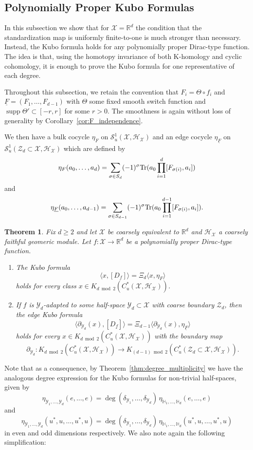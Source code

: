 \documentclass[12pt]{amsart}
\newtheorem{theorem}{Theorem}[section]
\newcommand{\RM}{{\mathbb R}}
\newcommand{\Ss}{{\mathcal S}}
\newcommand{\Hh}{{\mathcal H}}
\newcommand{\Xx}{{\mathcal X}}
\newcommand{\Yy}{{\mathcal Y}}
\newcommand{\Zz}{{\mathcal Z}}
\newcommand{\Tr}{\mbox{\rm Tr}}
\newcommand{\pdv}{\partial}
\DeclareMathOperator{\supp}{supp}
\begin{document}
\subsection{Polynomially Proper Kubo Formulas}

In this subsection we show that for $\Xx=\RM^d$ the condition that the standardization map is uniformly finite-to-one is much stronger than necessary. Instead, the Kubo formula holds for any polynomially proper Dirac-type function. The idea is that, using the homotopy invariance of both K-homology and cyclic cohomology, it is enough to prove the Kubo formula for one representative of each degree.

Throughout this subsection, we retain the convention that $F_i = \Theta \circ f_i$ and $\underline{F} = (F_1,\dots, F_{d-1})$ with $\Theta$ some fixed smooth switch function and $\supp \Theta' \subset [-r,r]$ for some $r >0$. The smoothness is again without loss of generality by Corollary~\ref{cor:F_independence}.

We then have a bulk cocycle $\eta_{F}$ on $\Ss_u^1(\Xx,\Hh_\Xx)$ and an edge cocycle $\eta_{\underline{F}}$ on $\Ss_u^1(\Zz_d\subset \Xx,\Hh_\Xx)$ which are defined by
$$\eta_{F}(a_0,\dots,a_d)= \sum_{\sigma\in S_{d}}(-1)^\sigma \Tr(a_{0}\prod_{i=1}^{d} [F_{\sigma(i)}, a_i])$$
and
$$\eta_{\underline{F}}(a_0,\dots,a_{d-1})= \sum_{\sigma\in S_{d-1}}(-1)^\sigma \Tr(a_{0}\prod_{i=1}^{d-1} [F_{\sigma(i)}, a_i]).$$

\begin{theorem}
\label{th:kubo_poly_proper}
Fix $d\geq 2$ and let $\Xx$ be coarsely equivalent to $\RM^d$ and $\Hh_\Xx$ a coarsely faithful geomeric module.
Let $f:\Xx\to \RM^d$ be a polynomially proper Dirac-type function.
\begin{enumerate}
    \item[(i)] The Kubo formula 
$$\langle x, [D_{f}]\rangle = \Xi_d \langle x, \eta_{F}\rangle$$ 
holds for every class $x\in K_{d\bmod 2}(C^*_u(\Xx, \Hh_\Xx))$.
    
    \item[(ii)] If $f$ is $\Yy_d$-adapted to some half-space $\Yy_d\subset \Xx$ with coarse boundary $\Zz_d$, then the edge Kubo formula
$$\langle \pdv_{\Yy_d}(x), [D_{\underline{f}}]\rangle=\Xi_{d-1} \langle  \pdv_{\Yy_d}(x) , \eta_{\underline{F}}\rangle$$
holds for every $x\in K_{d\bmod 2}(C^*_u(\Xx, \Hh_\Xx))$ with the boundary map \[\pdv_{\Yy_d}:  K_{d\bmod 2}(C^*_u(\Xx, \Hh_\Xx))\to  K_{(d-1) \bmod 2}(C^*_u(\Zz_d\subset \Xx, \Hh_\Xx)).\]
\end{enumerate}
\end{theorem}
Note that as a consequence, by Theorem~\ref{thm:degree_multiplicity} we have the analogous degree expression for the Kubo formulas for non-trivial half-spaces, given by 
\[\eta_{\Yy_1,\dots,\Yy_d}(e,\dots,e)=\deg(\delta_{\Yy_1},\dots,\delta_{\Yy_d} )\,\eta_{\mathbb{H}_1,\dots,\mathbb{H}_d}(e,\dots,e)\]
and 
\[\eta_{\Yy_1,\dots,\Yy_d}(u^*, u,\dots, u^*, u)=\deg(\delta_{\Yy_1},\dots,\delta_{\Yy_d} )\,\eta_{\mathbb{H}_1,\dots,\mathbb{H}_d}(u^*, u,\dots, u^*, u)\]
in even and odd dimensions respectively. We also note again the following simplification:
\end{document}
